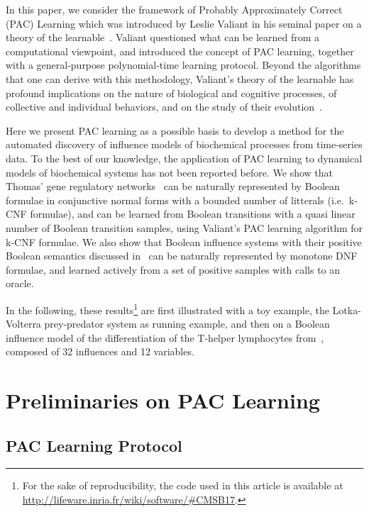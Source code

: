 \documentclass{llncs}
\begin{document}
In this paper, we consider the framework of Probably Approximately Correct (PAC) Learning 
which was introduced by Leslie Valiant in his seminal paper on a theory of the learnable~\cite{Valiant84cacm}.
Valiant questioned what can be learned from a computational viewpoint,
and introduced the concept of PAC learning,
together with a general-purpose polynomial-time learning protocol.
Beyond the algorithms that one can derive with this methodology,
Valiant's theory of the learnable has profound implications
on the nature of biological and cognitive processes,
of collective and individual behaviors,
and on the study of their evolution~\cite{Valiant13book}.

Here we present PAC learning as a possible basis to develop a method for the automated discovery of influence models of biochemical processes from time-series data. 
To the best of our knowledge, 
the application of PAC learning to dynamical models of biochemical systems has not been reported before.
We show that Thomas' gene regulatory networks~\cite{Thomas91jtb,Thomas73jtb} can be naturally represented by 
Boolean formulae in conjunctive normal forms with a bounded number of litterals (i.e.~k-CNF formulae),
and can be learned from Boolean transitions with a quasi linear number of Boolean transition samples, using Valiant's PAC learning algorithm for k-CNF formulae.
We also show that Boolean influence systems with their positive Boolean semantics discussed in~\cite{FMRS16cmsb}
can be naturally represented by monotone DNF formulae,
and learned actively from a set of positive samples with calls to an oracle.

In the following, these results\footnote{For the sake of reproducibility, the code used in this article is available at \url{http://lifeware.inria.fr/wiki/software/\#CMSB17}.} are first illustrated with a toy example, the Lotka-Volterra prey-predator system as running example,
and then on a Boolean influence model of 
the differentiation of the T-helper lymphocytes from~\cite{RRMTC06tcsb,Mendoza06biosystems},
composed of 32 influences and 12 variables.


\section{Preliminaries on PAC Learning}\label{pac}

\subsection{PAC Learning Protocol}
\end{document}
